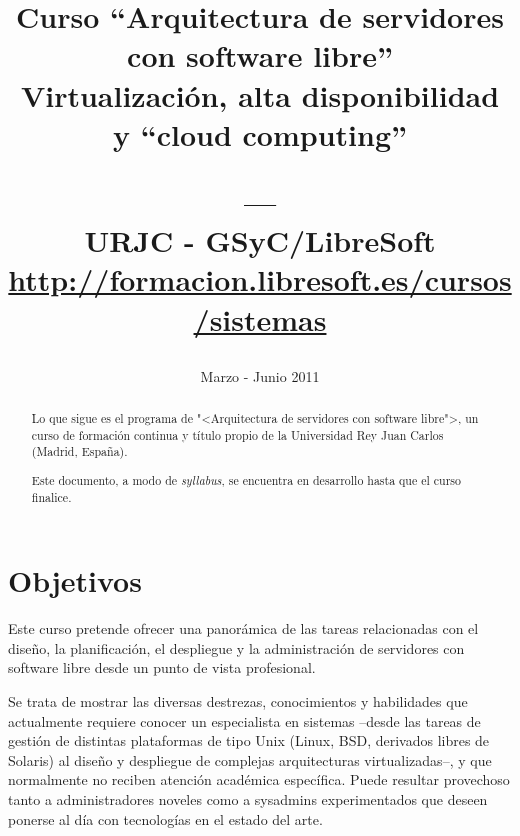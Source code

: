 \documentclass[a4paper]{article}
\title{\textbf{Curso ``Arquitectura de servidores \\ con software libre''} \\
Virtualización, alta disponibilidad \\ y ``cloud computing'' \\
\date{Marzo - Junio 2011}
\vspace{0.5cm}
--- \\
\normalsize{URJC - GSyC/LibreSoft} \\
\small{\url{http://formacion.libresoft.es/cursos/sistemas}}}
\begin{document}
  \maketitle

  \begin{abstract}
Lo que sigue es el programa de "<Arquitectura de servidores con software libre">, un curso de formación continua y título propio de la Universidad Rey Juan Carlos (Madrid, España). 

\medskip

Este documento, a modo de \textit{syllabus}, se encuentra en desarrollo hasta que el curso finalice.
  \end{abstract}
  \newpage

  \tableofcontents

  \newpage

  \section{Objetivos}
  Este curso pretende ofrecer una panorámica de las tareas relacionadas con el diseño, la planificación, el despliegue y la administración de servidores con software libre desde un punto de vista profesional.

Se trata de mostrar las diversas destrezas, conocimientos y habilidades que actualmente requiere conocer un especialista en sistemas –desde las tareas de gestión de distintas plataformas de tipo Unix (Linux, BSD, derivados libres de Solaris) al diseño y despliegue de complejas arquitecturas virtualizadas–, y que normalmente no reciben atención académica específica. Puede resultar provechoso tanto a administradores noveles como a sysadmins experimentados que deseen ponerse al día con tecnologías en el estado del arte.
\end{document}
